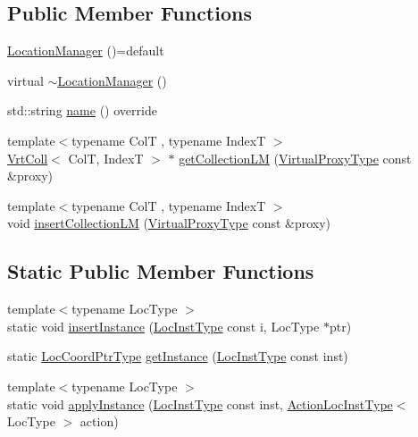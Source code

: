 \subsection*{Public Member Functions}
\begin{DoxyCompactItemize}
\item 
\hyperlink{structvt_1_1location_1_1_location_manager_af5cf57c9ef31ccf5b207394cbd9363ee}{Location\+Manager} ()=default
\item 
virtual \hyperlink{structvt_1_1location_1_1_location_manager_abdcd3feb1f6e7c22f88582ad87799de1}{$\sim$\+Location\+Manager} ()
\item 
std\+::string \hyperlink{structvt_1_1location_1_1_location_manager_afdb88906b8c4b5535f239d6581f840e0}{name} () override
\item 
{\footnotesize template$<$typename ColT , typename IndexT $>$ }\\\hyperlink{structvt_1_1location_1_1_location_manager_a189fc3b436520c19aada9623a6b4a42e}{Vrt\+Coll}$<$ ColT, IndexT $>$ $\ast$ \hyperlink{structvt_1_1location_1_1_location_manager_a2d95ed25544679c16a84a173e84b92b6}{get\+Collection\+LM} (\hyperlink{namespacevt_a1b417dd5d684f045bb58a0ede70045ac}{Virtual\+Proxy\+Type} const \&proxy)
\item 
{\footnotesize template$<$typename ColT , typename IndexT $>$ }\\void \hyperlink{structvt_1_1location_1_1_location_manager_ae62f2826ad6bebc5dcad0d6ad13af365}{insert\+Collection\+LM} (\hyperlink{namespacevt_a1b417dd5d684f045bb58a0ede70045ac}{Virtual\+Proxy\+Type} const \&proxy)
\end{DoxyCompactItemize}
\subsection*{Static Public Member Functions}
\begin{DoxyCompactItemize}
\item 
{\footnotesize template$<$typename Loc\+Type $>$ }\\static void \hyperlink{structvt_1_1location_1_1_location_manager_a61767ba0d9bd9029686c136cdb8eaece}{insert\+Instance} (\hyperlink{namespacevt_1_1location_a4db6456e8024af2d23fc5ae560fef866}{Loc\+Inst\+Type} const i, Loc\+Type $\ast$ptr)
\item 
static \hyperlink{structvt_1_1location_1_1_location_manager_a98ed824c058080e538546fc731cb8f4c}{Loc\+Coord\+Ptr\+Type} \hyperlink{structvt_1_1location_1_1_location_manager_a1533939b198e3d7a2d5298995b87ab21}{get\+Instance} (\hyperlink{namespacevt_1_1location_a4db6456e8024af2d23fc5ae560fef866}{Loc\+Inst\+Type} const inst)
\item 
{\footnotesize template$<$typename Loc\+Type $>$ }\\static void \hyperlink{structvt_1_1location_1_1_location_manager_ae87fb969a0c0e2a45ca3ff15a0f01c00}{apply\+Instance} (\hyperlink{namespacevt_1_1location_a4db6456e8024af2d23fc5ae560fef866}{Loc\+Inst\+Type} const inst, \hyperlink{structvt_1_1location_1_1_location_manager_a6de3841092c537efc5fb8376128bfe18}{Action\+Loc\+Inst\+Type}$<$ Loc\+Type $>$ action)
\end{DoxyCompactItemize}
